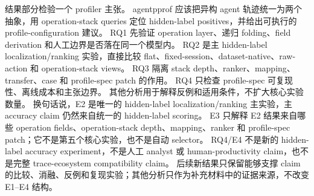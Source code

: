 \documentclass[10pt,twocolumn]{ctexart}
\newcommand{\toolname}{agentpprof}
\begin{document}
结果部分检验一个 profiler 主张。
\toolname{} 应该把异构 agent 轨迹统一为两个抽象，用 operation-stack queries 定位 hidden-label positives，并给出可执行的 profile-configuration 建议。
RQ1 先验证 operation layer、递归 folding、field derivation 和人工边界是否落在同一个模型内。
RQ2 是主 hidden-label localization/ranking 实验，直接比较 flat、fixed-session、dataset-native、raw-action 和 operation-stack views。
RQ3 隔离 stack depth、ranker、mapping、transfer、case 和 profile-spec patch 的作用。
RQ4 只检查 profile-spec 可复现性、离线成本和主张边界。
其他分析用于解释反例和适用条件，不扩大核心实验数量。
换句话说，E2 是唯一的 hidden-label localization/ranking 主实验，主 accuracy claim 仍然来自统一的 hidden-label scoring。
E3 只解释 E2 结果来自哪些 operation fields、operation-stack depth、mapping、ranker 和 profile-spec patch；它不是第五个核心实验，也不是自动 selector。
RQ4/E4 不是新的 hidden-label accuracy experiment，不是人工 analyst 或 human-productivity claim，也不是完整 trace-ecosystem compatibility claim。
后续新结果只保留能够支撑 claim 的比较、消融、反例和复现实验；其他分析只作为补充材料中的证据来源，不改变 E1--E4 结构。
\end{document}
